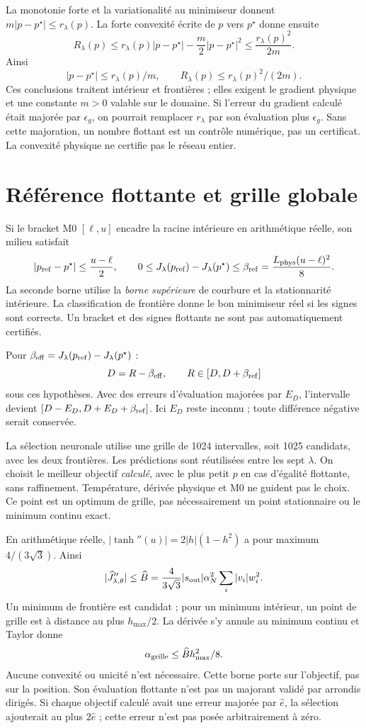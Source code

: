 \documentclass[11pt,a4paper]{article}
\newcommand{\Jhat}{\widehat J_{\lambda,\theta}}
\begin{document}
La monotonie forte et la variationalité au minimiseur donnent
$m|p-p^\star|\leq r_\lambda(p)$.
La forte convexité écrite de $p$ vers $p^\star$ donne ensuite
\[
R_\lambda(p)\leq r_\lambda(p)|p-p^\star|
-\frac m2|p-p^\star|^2\leq\frac{r_\lambda(p)^2}{2m}.
\]
Ainsi
\[
|p-p^\star|\leq r_\lambda(p)/m,\qquad
R_\lambda(p)\leq r_\lambda(p)^2/(2m).
\]
Ces conclusions traitent intérieur et frontières ; elles exigent le gradient
physique et une constante $m>0$ valable sur le domaine.
Si l'erreur du gradient calculé était majorée par $\epsilon_g$, on pourrait
remplacer $r_\lambda$ par son évaluation plus $\epsilon_g$.
Sans cette majoration, un nombre flottant est un contrôle numérique,
pas un certificat. La convexité physique ne certifie pas le réseau entier.

\clearpage
\section{Référence flottante et grille globale}
\label{sec:grille}
Si le bracket M0 $[\ell,u]$ encadre la racine intérieure en arithmétique
réelle, son milieu satisfait
\[
|p_{\rm ref}-p^\star|\leq\frac{u-\ell}{2},\qquad
0\leq J_\lambda(p_{\rm ref})-J_\lambda(p^\star)
\leq\beta_{\rm ref}=\frac{L_{\rm phys}(u-\ell)^2}{8}.
\]
La seconde borne utilise la \emph{borne supérieure} de courbure et la
stationnarité intérieure. La classification de frontière donne le bon
minimiseur réel si les signes sont corrects.
Un bracket et des signes flottants ne sont pas automatiquement certifiés.

Pour $\beta_{\rm eff}=J_\lambda(p_{\rm ref})-J_\lambda(p^\star)$ :
\[
D=R-\beta_{\rm eff},\qquad R\in[D,D+\beta_{\rm ref}]
\]
sous ces hypothèses. Avec des erreurs d'évaluation majorées par $E_D$,
l'intervalle devient $[D-E_D,D+E_D+\beta_{\rm ref}]$.
Ici $E_D$ reste inconnu ; toute différence négative serait conservée.

La sélection neuronale utilise une grille de 1024 intervalles, soit 1025
candidats, avec les deux frontières. Les prédictions sont réutilisées
entre les sept $\lambda$. On choisit le meilleur objectif \emph{calculé},
avec le plus petit $p$ en cas d'égalité flottante, sans raffinement.
Température, dérivée physique et M0 ne guident pas le choix.
Ce point est un optimum de grille, pas nécessairement un point stationnaire
ou le minimum continu exact.

En arithmétique réelle,
$|\tanh''(u)|=2|h|(1-h^2)$ a pour maximum $4/(3\sqrt3)$.
Ainsi
\[
|\Jhat''|\leq\widehat B=
\frac4{3\sqrt3}|s_{\rm out}|\alpha_N^2\sum_i|v_i|w_i^2.
\]
Un minimum de frontière est candidat ; pour un minimum intérieur,
un point de grille est à distance au plus $h_{\max}/2$.
La dérivée s'y annule au minimum continu et Taylor donne
\[
\alpha_{\rm grille}\leq\widehat B h_{\max}^2/8.
\]
Aucune convexité ou unicité n'est nécessaire. Cette borne porte sur
l'objectif, pas sur la position. Son évaluation flottante n'est pas
un majorant validé par arrondis dirigés.
Si chaque objectif calculé avait une erreur majorée par $\widehat e$,
la sélection ajouterait au plus $2\widehat e$ ; cette erreur n'est pas
posée arbitrairement à zéro.
\end{document}
